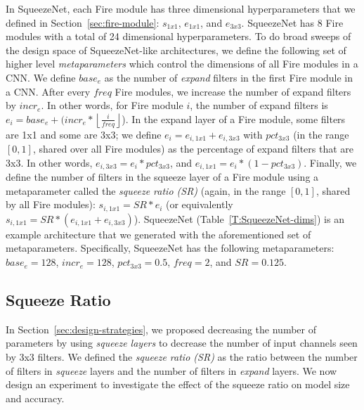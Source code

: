 \documentclass{article} %
\def\vsp{\vspace{-0.15in}}
\begin{document}
In SqueezeNet, each Fire module has three dimensional hyperparameters that we defined in Section~\ref{sec:fire-module}: $s_{1x1}$, $e_{1x1}$, and $e_{3x3}$. 
SqueezeNet has 8 Fire modules with a total of 24 dimensional hyperparameters.
To do broad sweeps of the design space of SqueezeNet-like architectures, we define the following set of higher level {\em metaparameters} which control the dimensions of all Fire modules in a CNN.
We define $base_e$ as the number of {\em expand} filters in the first Fire module in a CNN.
After every $freq$ Fire modules, we increase the number of expand filters by $incr_e$.
In other words, for Fire module $i$, the number of expand filters is $e_i=base_e + (incr_e*{\left\lfloor{\frac{i}{freq}}\right\rfloor}$).
In the expand layer of a Fire module, some filters are 1x1 and some are 3x3; we define $e_i = e_{i,{1x1}} + e_{i,{3x3}}$ with $pct_{3x3}$ (in the range $[0,1]$, shared over all Fire modules) as the percentage of expand filters that are 3x3.
In other words, $e_{i,{3x3}} = e_i*pct_{3x3}$, and $e_{i,{1x1}} = e_i*(1-pct_{3x3})$. 
Finally, we define the number of filters in the squeeze layer of a Fire module using a metaparameter called the {\em squeeze ratio (SR)} (again, in the range $[0,1]$, shared by all Fire modules): $s_{i,{1x1}} = SR * e_i$ (or equivalently $s_{i,{1x1}} = SR * (e_{i,{1x1}} + e_{i,{3x3}})$).
SqueezeNet (Table~\ref{T:SqueezeNet-dims}) is an example architecture that we generated with the aforementioned set of metaparameters.
Specifically, SqueezeNet has the following metaparameters: $base_e = 128$, $incr_e = 128$, $pct_{3x3} = 0.5$, $freq=2$, and $SR = 0.125$.

\subsection{Squeeze Ratio}
\label{sec:SR}
\vsp

In Section~\ref{sec:design-strategies}, we proposed decreasing the number of parameters by using {\em squeeze layers} to decrease the number of input channels seen by 3x3 filters.
We defined the {\em squeeze ratio (SR)} as the ratio between the number of filters in {\em squeeze} layers and the number of filters in {\em expand} layers.
We now design an experiment to investigate the effect of the squeeze ratio on model size and accuracy.
\end{document}
